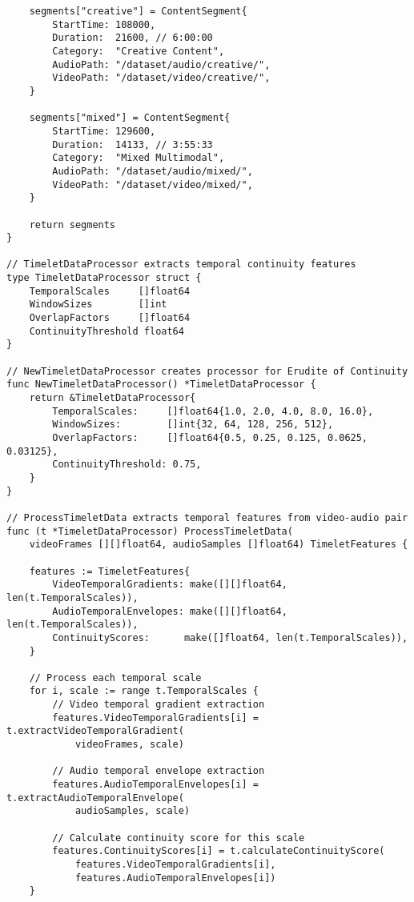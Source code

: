 \begin{tcolorbox}[colback=CodeBackground, colframe=DarkGray, title=Video-Audio Dataset Processing, fonttitle=\bfseries]
\begin{verbatim}
    segments["creative"] = ContentSegment{
        StartTime: 108000,
        Duration:  21600, // 6:00:00
        Category:  "Creative Content",
        AudioPath: "/dataset/audio/creative/",
        VideoPath: "/dataset/video/creative/",
    }
    
    segments["mixed"] = ContentSegment{
        StartTime: 129600,
        Duration:  14133, // 3:55:33
        Category:  "Mixed Multimodal",
        AudioPath: "/dataset/audio/mixed/",
        VideoPath: "/dataset/video/mixed/",
    }
    
    return segments
}

// TimeletDataProcessor extracts temporal continuity features
type TimeletDataProcessor struct {
    TemporalScales     []float64
    WindowSizes        []int
    OverlapFactors     []float64
    ContinuityThreshold float64
}

// NewTimeletDataProcessor creates processor for Erudite of Continuity
func NewTimeletDataProcessor() *TimeletDataProcessor {
    return &TimeletDataProcessor{
        TemporalScales:     []float64{1.0, 2.0, 4.0, 8.0, 16.0},
        WindowSizes:        []int{32, 64, 128, 256, 512},
        OverlapFactors:     []float64{0.5, 0.25, 0.125, 0.0625, 0.03125},
        ContinuityThreshold: 0.75,
    }
}

// ProcessTimeletData extracts temporal features from video-audio pair
func (t *TimeletDataProcessor) ProcessTimeletData(
    videoFrames [][]float64, audioSamples []float64) TimeletFeatures {
    
    features := TimeletFeatures{
        VideoTemporalGradients: make([][]float64, len(t.TemporalScales)),
        AudioTemporalEnvelopes: make([][]float64, len(t.TemporalScales)),
        ContinuityScores:      make([]float64, len(t.TemporalScales)),
    }
    
    // Process each temporal scale
    for i, scale := range t.TemporalScales {
        // Video temporal gradient extraction
        features.VideoTemporalGradients[i] = t.extractVideoTemporalGradient(
            videoFrames, scale)
        
        // Audio temporal envelope extraction
        features.AudioTemporalEnvelopes[i] = t.extractAudioTemporalEnvelope(
            audioSamples, scale)
        
        // Calculate continuity score for this scale
        features.ContinuityScores[i] = t.calculateContinuityScore(
            features.VideoTemporalGradients[i], 
            features.AudioTemporalEnvelopes[i])
    }
    

\end{verbatim}
\end{tcolorbox}
